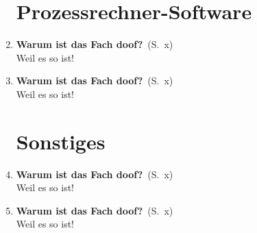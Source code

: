 \documentclass[a4paper,latin1,12pt]{article}
\newcommand{\question}[3]{\item {\textbf{#1?}}\ (S.\ #2)\\[2mm]#3}
\newcommand{\normaltext}[1]{#1\\}
\begin{document}
\begin{enumerate}
  \newpage
  \section{Prozessrechner-Software}

  \question{Warum ist das Fach doof}{x}
  {
    \normaltext{Weil es so ist!}
  }

  \question{Warum ist das Fach doof}{x}
  {
    \normaltext{Weil es so ist!}
  }

  \newpage
  \section{Sonstiges}

  \question{Warum ist das Fach doof}{x}
  {
    \normaltext{Weil es so ist!}
  }

  \question{Warum ist das Fach doof}{x}
  {
    \normaltext{Weil es so ist!}
  }

\end{enumerate}
\end{document}
